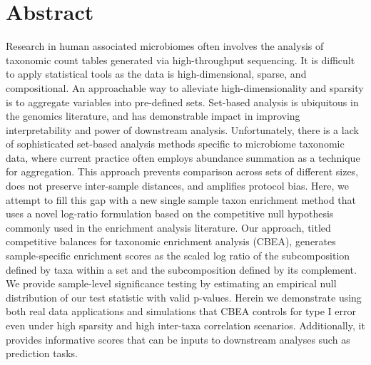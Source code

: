 \documentclass[10pt,letterpaper]{article}
\begin{document}
\section*{Abstract}
Research in human associated microbiomes often involves the analysis of taxonomic count tables generated via high-throughput sequencing. It is difficult to apply statistical tools as the data is high-dimensional, sparse, and compositional. An approachable way to alleviate high-dimensionality and sparsity is to aggregate variables into pre-defined sets. Set-based analysis is ubiquitous in the genomics literature, and has demonstrable impact in improving interpretability and power of downstream analysis. Unfortunately, there is a lack of sophisticated set-based analysis methods specific to microbiome taxonomic data, where current practice often employs abundance summation as a technique for aggregation. This approach prevents comparison across sets of different sizes, does not preserve inter-sample distances, and amplifies protocol bias. Here, we attempt to fill this gap with a new single sample taxon enrichment method that uses a novel log-ratio formulation based on the competitive null hypothesis commonly used in the enrichment analysis literature. Our approach, titled competitive balances for taxonomic enrichment analysis (CBEA), generates sample-specific enrichment scores as the scaled log ratio of the subcomposition defined by taxa within a set and the subcomposition defined by its complement. We provide sample-level significance testing by estimating an empirical null distribution of our test statistic with valid p-values. Herein we demonstrate using both real data applications and simulations that CBEA controls for type I error even under high sparsity and high inter-taxa correlation scenarios. Additionally, it provides informative scores that can be inputs to downstream analyses such as prediction tasks. 


\end{document}
